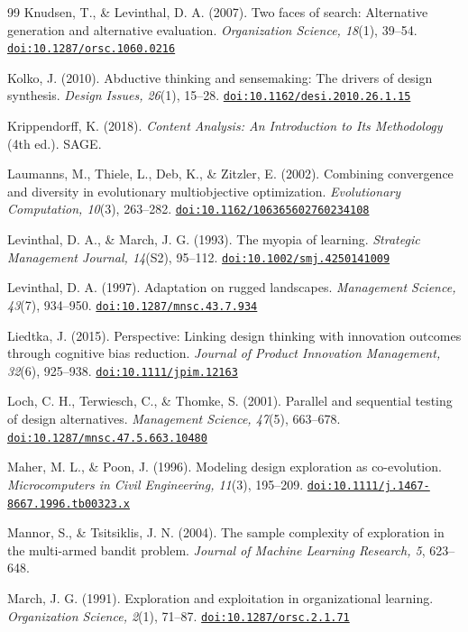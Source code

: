 \documentclass[preprint,review,11pt,authoryear]{elsarticle}
\providecommand{\doi}[1]{\href{https://doi.org/#1}{\nolinkurl{doi:#1}}}
\theoremstyle{definition}
\begin{document}
\begin{thebibliography}{99}
 Knudsen, T., \& Levinthal, D. A. (2007). Two faces of search: Alternative generation and alternative evaluation. \textit{Organization Science, 18}(1), 39--54. \doi{10.1287/orsc.1060.0216}

 Kolko, J. (2010). Abductive thinking and sensemaking: The drivers of design synthesis. \textit{Design Issues, 26}(1), 15--28. \doi{10.1162/desi.2010.26.1.15}

 Krippendorff, K. (2018). \textit{Content Analysis: An Introduction to Its Methodology} (4th ed.). SAGE.

 Laumanns, M., Thiele, L., Deb, K., \& Zitzler, E. (2002). Combining convergence and diversity in evolutionary multiobjective optimization. \textit{Evolutionary Computation, 10}(3), 263--282. \doi{10.1162/106365602760234108}

 Levinthal, D. A., \& March, J. G. (1993). The myopia of learning. \textit{Strategic Management Journal, 14}(S2), 95--112. \doi{10.1002/smj.4250141009}

 Levinthal, D. A. (1997). Adaptation on rugged landscapes. \textit{Management Science, 43}(7), 934--950. \doi{10.1287/mnsc.43.7.934}

 Liedtka, J. (2015). Perspective: Linking design thinking with innovation outcomes through cognitive bias reduction. \textit{Journal of Product Innovation Management, 32}(6), 925--938. \doi{10.1111/jpim.12163}

 Loch, C. H., Terwiesch, C., \& Thomke, S. (2001). Parallel and sequential testing of design alternatives. \textit{Management Science, 47}(5), 663--678. \doi{10.1287/mnsc.47.5.663.10480}

 Maher, M. L., \& Poon, J. (1996). Modeling design exploration as co-evolution. \textit{Microcomputers in Civil Engineering, 11}(3), 195--209. \doi{10.1111/j.1467-8667.1996.tb00323.x}

 Mannor, S., \& Tsitsiklis, J. N. (2004). The sample complexity of exploration in the multi-armed bandit problem. \textit{Journal of Machine Learning Research, 5}, 623--648.

 March, J. G. (1991). Exploration and exploitation in organizational learning. \textit{Organization Science, 2}(1), 71--87. \doi{10.1287/orsc.2.1.71}


\end{thebibliography}
\end{document}
